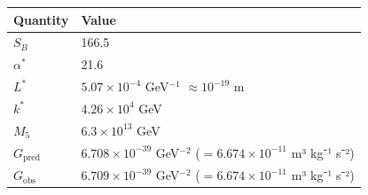 \documentclass[
  11pt,
]{article}
\begin{document}
\begin{longtable}[]{@{}ll@{}}
\toprule
\begin{minipage}[b]{0.47\columnwidth}\raggedright
Quantity\strut
\end{minipage} & \begin{minipage}[b]{0.47\columnwidth}\raggedright
Value\strut
\end{minipage}\tabularnewline
\midrule
\endhead
\begin{minipage}[t]{0.47\columnwidth}\raggedright
\(S_B\)\strut
\end{minipage} & \begin{minipage}[t]{0.47\columnwidth}\raggedright
166.5\strut
\end{minipage}\tabularnewline
\begin{minipage}[t]{0.47\columnwidth}\raggedright
\(\alpha^*\)\strut
\end{minipage} & \begin{minipage}[t]{0.47\columnwidth}\raggedright
21.6\strut
\end{minipage}\tabularnewline
\begin{minipage}[t]{0.47\columnwidth}\raggedright
\(L^*\)\strut
\end{minipage} & \begin{minipage}[t]{0.47\columnwidth}\raggedright
\(5.07 \times 10^{-4}\) GeV\(^{-1}\) \(\approx 10^{-19}\) m\strut
\end{minipage}\tabularnewline
\begin{minipage}[t]{0.47\columnwidth}\raggedright
\(k^*\)\strut
\end{minipage} & \begin{minipage}[t]{0.47\columnwidth}\raggedright
\(4.26 \times 10^4\) GeV\strut
\end{minipage}\tabularnewline
\begin{minipage}[t]{0.47\columnwidth}\raggedright
\(M_5\)\strut
\end{minipage} & \begin{minipage}[t]{0.47\columnwidth}\raggedright
\(6.3 \times 10^{13}\) GeV\strut
\end{minipage}\tabularnewline
\begin{minipage}[t]{0.47\columnwidth}\raggedright
\(G_{\text{pred}}\)\strut
\end{minipage} & \begin{minipage}[t]{0.47\columnwidth}\raggedright
\(6.708 \times 10^{-39}\) GeV\(^{-2}\) (\(= 6.674 \times 10^{-11}\) m³
kg⁻¹ s⁻²)\strut
\end{minipage}\tabularnewline
\begin{minipage}[t]{0.47\columnwidth}\raggedright
\(G_{\text{obs}}\)\strut
\end{minipage} & \begin{minipage}[t]{0.47\columnwidth}\raggedright
\(6.709 \times 10^{-39}\) GeV\(^{-2}\) (\(= 6.674 \times 10^{-11}\) m³
kg⁻¹ s⁻²)\strut
\end{minipage}\tabularnewline
\bottomrule
\end{longtable}
\end{document}
